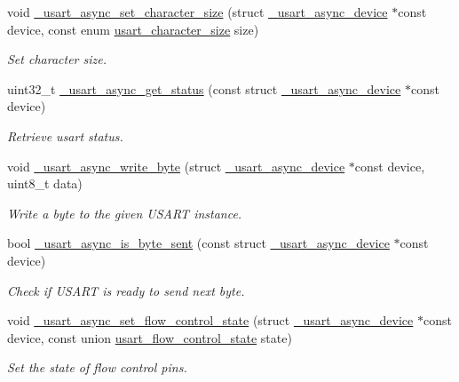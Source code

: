 \begin{DoxyCompactItemize}
void \hyperlink{group___h_p_l_gaf834af5cc0738976ddbc200901aef105}{\+\_\+usart\+\_\+async\+\_\+set\+\_\+character\+\_\+size} (struct \hyperlink{struct__usart__async__device}{\+\_\+usart\+\_\+async\+\_\+device} $\ast$const device, const enum \hyperlink{group___h_p_l_ga631ce7b4f60dccd392e6d6ef7d3cd4e2}{usart\+\_\+character\+\_\+size} size)
\begin{DoxyCompactList}\small\item\em Set character size. \end{DoxyCompactList}\item 
uint32\+\_\+t \hyperlink{group___h_p_l_ga09d708dc23dacf358d3de8a3a0545c1a}{\+\_\+usart\+\_\+async\+\_\+get\+\_\+status} (const struct \hyperlink{struct__usart__async__device}{\+\_\+usart\+\_\+async\+\_\+device} $\ast$const device)
\begin{DoxyCompactList}\small\item\em Retrieve usart status. \end{DoxyCompactList}\item 
void \hyperlink{group___h_p_l_ga3a2887cd1710eaad2df0e66b9e830faa}{\+\_\+usart\+\_\+async\+\_\+write\+\_\+byte} (struct \hyperlink{struct__usart__async__device}{\+\_\+usart\+\_\+async\+\_\+device} $\ast$const device, uint8\+\_\+t data)
\begin{DoxyCompactList}\small\item\em Write a byte to the given U\+S\+A\+RT instance. \end{DoxyCompactList}\item 
bool \hyperlink{group___h_p_l_gaf96fbe9e0e063f4ae332451b7a540e2c}{\+\_\+usart\+\_\+async\+\_\+is\+\_\+byte\+\_\+sent} (const struct \hyperlink{struct__usart__async__device}{\+\_\+usart\+\_\+async\+\_\+device} $\ast$const device)
\begin{DoxyCompactList}\small\item\em Check if U\+S\+A\+RT is ready to send next byte. \end{DoxyCompactList}\item 
void \hyperlink{group___h_p_l_gafdf581028b78744fccccae79d45a2078}{\+\_\+usart\+\_\+async\+\_\+set\+\_\+flow\+\_\+control\+\_\+state} (struct \hyperlink{struct__usart__async__device}{\+\_\+usart\+\_\+async\+\_\+device} $\ast$const device, const union \hyperlink{unionusart__flow__control__state}{usart\+\_\+flow\+\_\+control\+\_\+state} state)
\begin{DoxyCompactList}\small\item\em Set the state of flow control pins. \end{DoxyCompactList}\item 

\end{DoxyCompactItemize}
